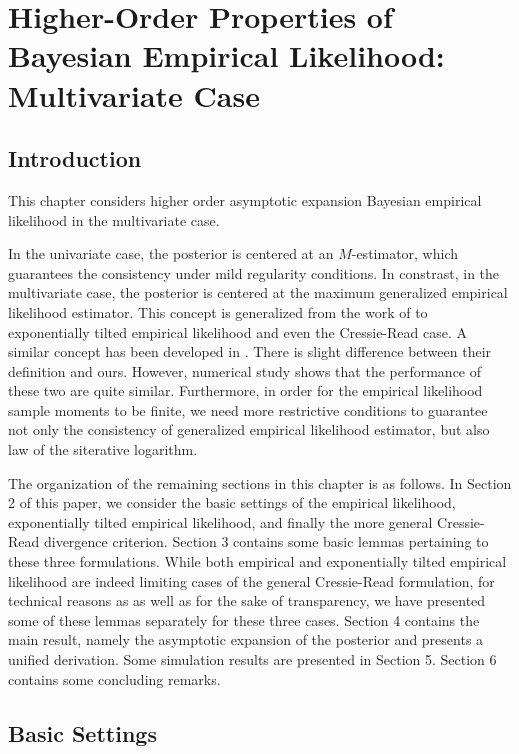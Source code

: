 \chapter{Higher-Order Properties of Bayesian Empirical Likelihood: Multivariate
Case}

\setcounter{assumption}{0}

\section{Introduction}
This chapter considers higher order asymptotic expansion Bayesian empirical likelihood in the multivariate case.

In the univariate case, the posterior is centered at an $M$-estimator,
which guarantees the consistency under mild regularity conditions. In constrast,
in the
multivariate case, the posterior is centered at the maximum generalized
empirical likelihood estimator. This concept is generalized from 
the work of \citet{qin1994empirical}
to exponentially tilted empirical likelihood and even the Cressie-Read
case. A similar concept has been developed in \citet{newey2004higher}
. There is slight difference between their definition
and ours. However, numerical
study shows that the performance of these two are quite similar. Furthermore,
in order for the empirical likelihood sample moments to be finite,
we need more restrictive conditions to guarantee not only the consistency
of generalized empirical likelihood estimator, but also law of
the siterative logarithm. 

The organization of the remaining sections in this chapter is as follows.
In Section 2 of this paper, we consider the basic settings of the
empirical likelihood, exponentially tilted empirical likelihood, and
finally the more general Cressie-Read divergence criterion. Section
3 contains some basic lemmas pertaining to these three formulations.
While both empirical and exponentially tilted empirical likelihood
are indeed limiting cases of the general Cressie-Read formulation,
for technical reasons as as well as for the sake of transparency,
we have presented some of these lemmas separately for these three
cases. Section 4 contains the main result, namely the asymptotic expansion
of the posterior and presents a unified derivation. Some simulation
results are presented in Section 5. Section 6 contains some concluding
remarks.


\section{Basic Settings}


